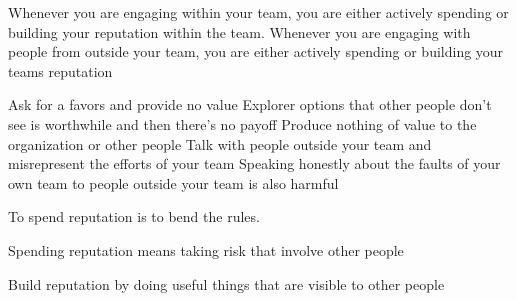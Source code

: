 Whenever you are engaging within your team, you are either actively spending or building your reputation within the team.
Whenever you are engaging with people from outside your team, you are either actively spending or building your teams reputation

Ask for a favors and provide no value
Explorer options that other people don't see is worthwhile and then there's no payoff
Produce nothing of value to the organization or other people
Talk with people outside your team and misrepresent the efforts of your team
Speaking honestly about the faults of your own team to people outside your team is also harmful

To spend reputation is to bend the rules. 

Spending reputation means taking risk that involve other people

Build reputation by doing useful things that are visible to other people















